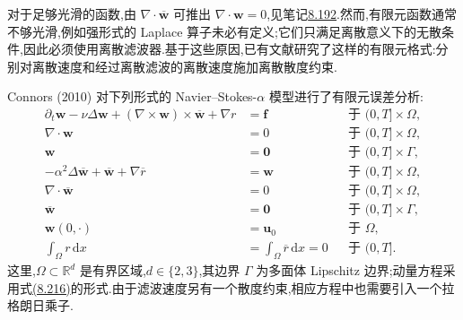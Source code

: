 \begin{note}[有限元问题]
\label{note:navier-stokes-alpha-finite-element-problem}
对于足够光滑的函数,由 $\nabla\cdot\overline{\bm{w}}$ 可推出 $\nabla\cdot\bm{w}=0$,见笔记\hyperref[note:navier-stokes-alpha-divergence-constraint]{8.192}.然而,有限元函数通常不够光滑,例如强形式的 Laplace 算子未必有定义;它们只满足离散意义下的无散条件,因此必须使用离散滤波器.基于这些原因,已有文献研究了这样的有限元格式:分别对离散速度和经过离散滤波的离散速度施加离散散度约束.

Connors (2010) 对下列形式的 Navier--Stokes-$\alpha$ 模型进行了有限元误差分析:
\begin{equation}\label{eq:navier-stokes-alpha-fem-strong}
\begin{aligned}
 \partial_t\bm{w}-\nu\Delta\bm{w}
  +(\nabla\times\bm{w})\times\overline{\bm{w}}
  +\nabla r&=\bm{f}
  &&\text{于 }(0,T]\times\Omega,\\
 \nabla\cdot\bm{w}&=0
  &&\text{于 }(0,T]\times\Omega,\\
 \bm{w}&=\bm{0}
  &&\text{于 }(0,T]\times\Gamma,\\
 -\alpha^2\Delta\overline{\bm{w}}+\overline{\bm{w}}
  +\nabla\overline r&=\bm{w}
  &&\text{于 }(0,T]\times\Omega,\\
 \nabla\cdot\overline{\bm{w}}&=0
  &&\text{于 }(0,T]\times\Omega,\\
 \overline{\bm{w}}&=\bm{0}
  &&\text{于 }(0,T]\times\Gamma,\\
 \bm{w}(0,\cdot)&=\bm{u}_0
  &&\text{于 }\Omega,\\
 \int_\Omega r\,\mathrm{d}x
  &=\int_\Omega\overline r\,\mathrm{d}x=0
  &&\text{于 }(0,T].
\end{aligned}
\end{equation}
这里,$\Omega\subset\mathbb{R}^d$ 是有界区域,$d\in\{2,3\}$,其边界 $\Gamma$ 为多面体 Lipschitz 边界;动量方程采用式\hyperref[eq:navier-stokes-alpha-rotational-form]{(8.216)}的形式.由于滤波速度另有一个散度约束,相应方程中也需要引入一个拉格朗日乘子.


\end{note}
